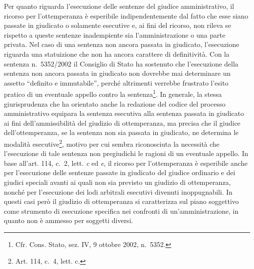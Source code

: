 \documentclass[12pt,it,a4paper,]{report}
\begin{document}
Per quanto riguarda l'esecuzione delle sentenze del giudice
amministrativo, il ricorso per l'ottemperanza è esperibile
indipendentemente dal fatto che esse siano passate in giudicato o
solamente esecutive e, ai fini del ricorso, non rileva se rispetto a
queste sentenze inadempiente sia l'amministrazione o una parte privata.
Nel caso di una sentenza non ancora passata in giudicato, l'esecuzione
riguarda una statuizione che non ha ancora carattere di definitività.
Con la sentenza n.~5352/2002 il Consiglio di Stato ha sostenuto che
l'esecuzione della sentenza non ancora passata in giudicato non dovrebbe
mai determinare un assetto ``definito e immutabile'', perché altrimenti
verrebbe frustrato l'esito pratico di un eventuale appello contro la
sentenza\footnote{Cfr. Cons. Stato, sez. IV, 9 ottobre 2002, n.~5352.}.
In generale, la stessa giurisprudenza che ha orientato anche la
redazione del codice del processo amministrativo equipara la sentenza
esecutiva alla sentenza passata in giudicato ai fini dell'ammissibilità
del giudizio di ottemperanza, ma precisa che il giudice
dell'ottemperanza, se la sentenza non sia passata in giudicato, ne
determina le modalità esecutive\footnote{Art. 114, c.~4, lett. c.},
motivo per cui sembra riconosciuta la necessità che l'esecuzione di tale
sentenza non pregiudichi le ragioni di un eventuale appello. In base
all'art. 114, c.~2, lett. \emph{c} ed \emph{e}, il ricorso per
l'ottemperanza è esperibile anche per l'esecuzione delle sentenze
passate in giudicato del giudice ordinario e dei giudici speciali avanti
ai quali non sia previsto un giudizio di ottemperanza, nonché per
l'esecuzione dei lodi arbitrali esecutivi divenuti inoppugnabili. In
questi casi però il giudizio di ottemperanza si caratterizza sul piano
soggettivo come strumento di esecuzione specifica nei confronti di
un'amministrazione, in quanto non è ammesso per soggetti diversi.
\end{document}
